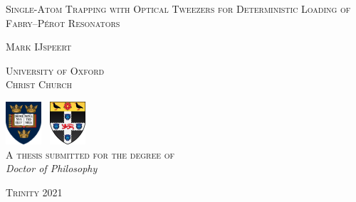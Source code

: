 \documentclass[../Thesis-IJspeert.tex]{subfiles}
\begin{document}
\graphicspath{ {Title/figs/} }

\newlength{\drop}%

\begin{titlepage}
	
\textheight
\vspace*{\drop}
\begin{center}
\vspace{-2em}
{\Large \textsc{Single-Atom Trapping with Optical Tweezers for Deterministic Loading of Fabry–Pérot Resonators} }\\[0cm]
\vspace{3em}
\ornamentSep

\vspace{3em}

{\large\textsc{Mark IJspeert}}
\vfill

\textsc{University of Oxford\\}
\textsc{Christ Church\\}
\vspace{2.7em}

\includegraphics[width=0.1\textwidth]{ox2}~\hspace{1cm}
\vspace{1em}
\includegraphics[width=0.1\textwidth,trim=0cm 0cm 0cm 0cm,clip]{chch}~\\[0.25\baselineskip]


\textsc{A thesis submitted for the degree of\\}
\emph{Doctor of Philosophy\\}

\vspace{2em}
{\textsc{Trinity 2021}}
\end{center}

\end{titlepage}
\end{document}
